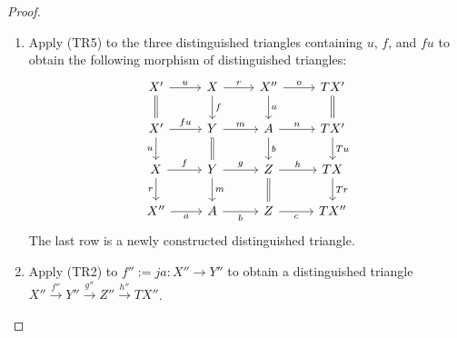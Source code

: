 \begin{proof}
\begin{enumerate}
		\item Apply (TR5) to the three distinguished triangles containing
		$u$, $f$, and $fu$ to obtain the following morphism of distinguished
		triangles:
		\begin{equation}\label{eqn:triangulated-9-diag-aux-1}\begin{tikzcd}
			X' \arrow[r, "u"] \arrow[equal, d] & X \arrow[r, "r"] \arrow[d, "f"] & X'' \arrow[r, "o"] \arrow[d, "a"] & TX' \arrow[equal, d] \\
			X' \arrow[r, "fu"] \arrow[d, "u"'] & Y \arrow[r, "m"] \arrow[equal, d] & A \arrow[r, "n"] \arrow[d, "b"] & TX' \arrow[d, "Tu"] \\
			X \arrow[r, "f"] \arrow[d, "r"'] & Y \arrow[r, "g"] \arrow[d, "m"] & Z \arrow[r, "h"] \arrow[equal, d] & TX \arrow[d, "Tr"] \\
			X'' \arrow[r, "a"'] & A \arrow[r, "b"'] & Z \arrow[r, "c"'] & TX''
		\end{tikzcd}\end{equation}
		The last row is a newly constructed distinguished triangle.

		\item Apply (TR2) to $f'' := ja: X'' \to Y''$ to obtain a
		distinguished triangle
		$X'' \xrightarrow{f''} Y'' \xrightarrow{g''} Z''
		\xrightarrow{h''} TX''$.


\end{enumerate}
\end{proof}
